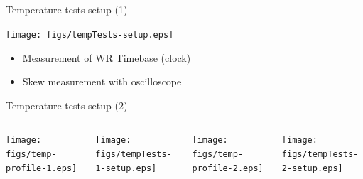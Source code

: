 \documentclass[compress,red]{beamer}
\begin{document}
\subsection{}
\begin{frame}{Temperature tests setup (1)}

	\begin{center}
	\texttt{[image: figs/tempTests-setup.eps]}

	\begin{itemize}
		\item Measurement of WR Timebase (clock)
		\item Skew measurement with oscilloscope
	\end{itemize}	

	\end{center}


\end{frame}
\begin{frame}{Temperature tests setup (2)}

\vspace{-1cm}
  \begin{columns}[c]
		\hspace{-1cm}
		\begin{center}
		\texttt{[image: figs/temp-profile-1.eps]}
		\end{center}
\vspace{-0.5cm}
		\begin{center}
		\texttt{[image: figs/tempTests-1-setup.eps]}
		\end{center}
		\hspace{-1cm}
		\begin{center}
		\texttt{[image: figs/temp-profile-2.eps]}
		\end{center}
		\vspace{-0.5cm}
		\begin{center}
		\texttt{[image: figs/tempTests-2-setup.eps]}
		\end{center}
  \end{columns}

\end{frame}
\end{document}
